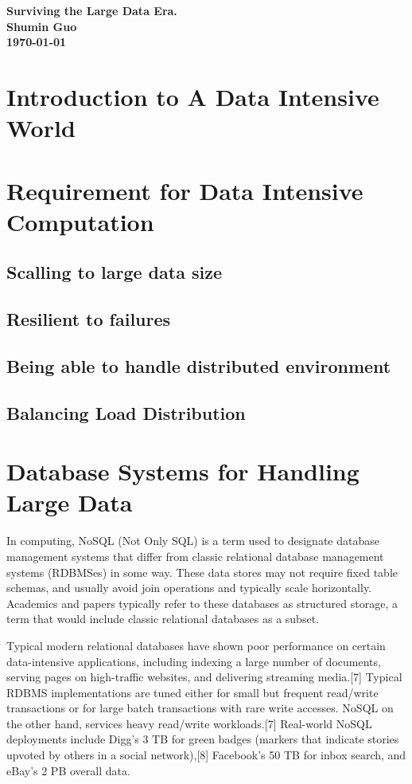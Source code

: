 \documentclass[a4paper]{article}
\begin{document}
\begin{center}
\textbf{\LARGE{Surviving the Large Data Era.} \\ 
Shumin Guo \\
\today}
\end{center}

\section{Introduction to A Data Intensive World\label{sec:intro}}

\section{Requirement for Data Intensive
  Computation \label{sec:relatedwork}}
\subsection{Scalling to large data size} 

\subsection{Resilient to failures}

\subsection{Being able to handle distributed environment}

\subsection{Balancing Load Distribution}  

\section{Database Systems for Handling Large Data \label{sec:redefine}}
In computing, NoSQL (Not Only SQL) is a term used to designate
database management systems that differ from classic relational
database management systems (RDBMSes) in some way. These data stores
may not require fixed table schemas, and usually avoid join operations
and typically scale horizontally. Academics and papers typically refer
to these databases as structured storage, a term that
would include classic relational databases as a subset.

Typical modern relational databases have shown poor performance on
certain data-intensive applications, including indexing a large number
of documents, serving pages on high-traffic websites, and delivering
streaming media.[7] Typical RDBMS implementations are tuned either for
small but frequent read/write transactions or for large batch
transactions with rare write accesses. NoSQL on the other hand,
services heavy read/write workloads.[7] Real-world NoSQL deployments
include Digg's 3 TB for green badges (markers that indicate stories
upvoted by others in a social network),[8] Facebook's 50 TB for inbox
search, and eBay's 2 PB overall data.
\end{document}
